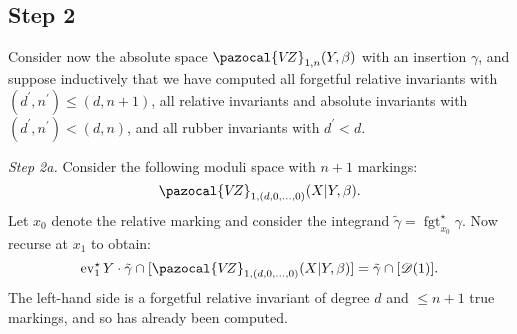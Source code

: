 \documentclass[11pt]{amsart}
\newcommand{\VZ}{\pazocal{V\!Z}}
\newcommand{\st}{\star}
\newcommand{\ev}{\operatorname{ev}}
\newcommand{\fgt}{\operatorname{fgt}}
\newcommand{\Dcal}{\mathcal{D}}
\theoremstyle{definition}
\theoremstyle{definition}
\begin{document}
\subsection*{Step 2} Consider now the absolute space $\VZ_{1,n}(Y,\beta)$ with an insertion $\gamma$, and suppose inductively that we have computed all forgetful relative invariants with $(d^\prime,n^\prime) \leq (d,n+1)$, all relative invariants and absolute invariants with $(d^\prime,n^\prime) < (d,n)$, and all rubber invariants with $d^\prime < d$. \medskip

\noindent \emph{Step 2a.} Consider the following moduli space with $n+1$ markings:
\begin{equation*} \VZ_{1,(d,0,\ldots,0)}(X|Y,\beta). \end{equation*}
Let $x_0$ denote the relative marking and consider the integrand $\tilde\gamma= \fgt_{x_0}^\st \gamma$. Now recurse at $x_1$ to obtain:
\begin{equation}\label{step 2 recursion} \ev_1^\st Y \cdot \tilde\gamma \cap [\VZ_{1,(d,0,\ldots,0)}(X|Y,\beta)] = \tilde\gamma\cap[\Dcal(1)].\end{equation}
The left-hand side is a forgetful relative invariant of degree $d$ and $\leq n+1$ true markings, and so has already been computed.
\end{document}
